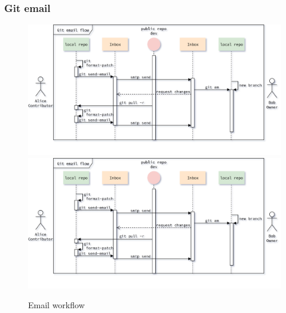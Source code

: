 \begin{frame}
    \frametitle{Git email}
    \addtocounter{page}{-1}
    \begin{figure}
        \begin{center}
            {
                \includegraphics[height=0.7\textheight,keepaspectratio]{./images/EmailWorkflow_SendSecoundPatch.png}
            }
            {
                \includegraphics[height=0.75\textheight,keepaspectratio]{./images/EmailWorkflow_SendSecoundPatch.png}
            }
            \caption{Email workflow}
        \end{center}
    \end{figure}
\end{frame}

